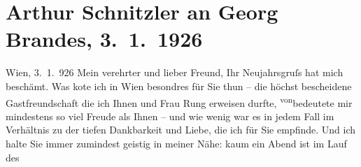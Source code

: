 

         
         \renewcommand{\erwaehntePersonen}{Personen: Georg Brandes, Gertrud Rung}
         \renewcommand{\erwaehnteInstitutionen}{Institutionen: Die Dame, Vossische Zeitung}
         \renewcommand{\erwaehnteOrte}{Orte: Kopenhagen, Wien}
         \renewcommand{\erwaehnteWerke}{Werke: Der Gang zum Weiher. Dramatische Dichtung, Der Geist im Wort und der Geist in der Tat, Die Frau des Richters. Novelle, Traumnovelle}
               \section[Arthur Schnitzler an Georg Brandes, 3. 1. 1926]{ Arthur Schnitzler an Georg Brandes, 3. 1. 1926}\nopagebreak{}\rehead{ }\begin{ledgroupsized}[t]{13cm}\normalsize\beginnumbering{} \toendnotes[C]{\smallbreak\pagebreak[2]} 
\pstart
           \raggedleft{}{\pb}Wien, 3. 1. 926\pend
           \pstart{}Mein verehrter und lieber Freund,\pend\pstart
           Ihr Neujahrsgruſs hat mich beschämt. Was ko{\geminationn}te ich in
                  Wien besondres für Sie thun – die höchst
               bescheidene Gastfreundschaft die ich Ihnen und Frau Rung erweisen durfte, \substVorne{}\textsuperscript{von}\substDazwischen{}bedeutete\substHinten{} mir mindestens so viel Freude als Ihnen – und wie wenig war es in jedem Fall
               im Verhältnis zu der tiefen Dankbarkeit und Liebe, die ich für Sie empfinde. Und ich
               halte Sie immer zumindest geistig in meiner Nähe: kaum ein Abend ist im Lauf des

\end{ledgroupsized}

